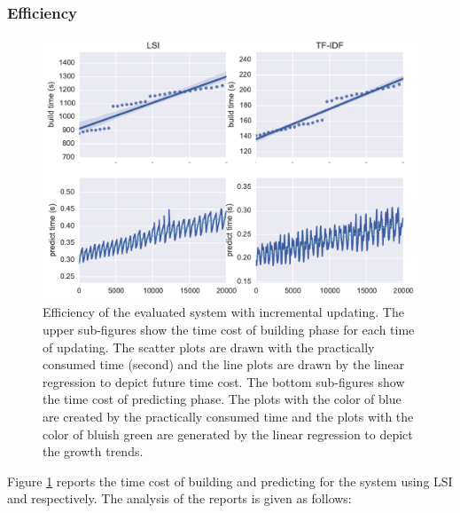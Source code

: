 \subsubsection{Efficiency}

\begin{figure}[!htb]
    \centering
    \includegraphics[width=\textwidth]{fig/runtime_inc}
    \caption[Efficiency of the evaluated system with incremental updating]{Efficiency of the evaluated system with incremental updating. The upper sub-figures show the time cost of building phase for each time of updating. The scatter plots are drawn with the practically consumed time (second) and the line plots are drawn by the linear regression to depict future time cost. The bottom sub-figures show the time cost of predicting phase. The plots with the color of blue are created by the practically consumed time and the plots with the color of bluish green are generated by the linear regression to depict the growth trends. }
    \label{fig:runtime_inc}
\end{figure}

Figure \ref{fig:runtime_inc} reports the time cost of building and predicting for the system using LSI and \tfidf{} respectively. The analysis of the reports is given as follows:

